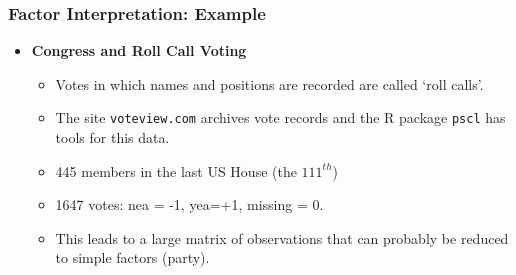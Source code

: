 \documentclass[
  shownotes,
  xcolor={svgnames},
  hyperref={colorlinks,citecolor=DarkBlue,linkcolor=DarkRed,urlcolor=DarkBlue}
  , aspectratio=169]{beamer}
\newcommand{\theme}{\color{andesred}}
\newcommand{\gr}{\color{black!60}}
\newcommand{\nv}{\color{Navy}}
\begin{document}
\begin{frame}[fragile]
\frametitle{Factor Interpretation: Example}


\begin{itemize}
\item {\bf Congress and \theme Roll Call Voting}
\bigskip
\begin{itemize}
  \item Votes in which names and positions are recorded are called `roll calls'.
  \medskip
  \item The site {\tt voteview.com} archives vote records and the R package { \tt pscl} has tools for this data.
  \medskip
  \item 445 members in the last US House  (the $111^{th}$)
  \medskip
  \item 1647 votes:  \theme nea = -1, \nv yea=+1, \gr missing = 0.
  \medskip
  \item This leads to a large matrix of observations that can probably be reduced to simple factors {\gr (party)}.
\end{itemize}
\end{itemize}





\end{frame}
\end{document}
